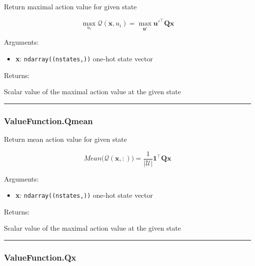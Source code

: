 Return maximal action value for given state

\[
\max_{u_i}\mathcal Q(\mathbf x, u_i) = \max_{\mathbf u'} \mathbf u'^\top \mathbf Q \mathbf x
\]

Arguments:

\begin{itemize}
\tightlist
\item
  \textbf{x}: \texttt{ndarray((nstates,))} one-hot state vector
\end{itemize}

Returns:

Scalar value of the maximal action value at the given state

\begin{center}\rule{0.5\linewidth}{\linethickness}\end{center}

\hypertarget{valuefunction.qmean}{%
\subsubsection{ValueFunction.Qmean}\label{valuefunction.qmean}}

\begin{Shaded}
\begin{Highlighting}[]
\end{Highlighting}
\end{Shaded}

Return mean action value for given state

\[
Mean \big(\mathcal Q(\mathbf x, :)\big) = \frac{1}{|\mathcal U|} \mathbf 1^\top \mathbf Q \mathbf x
\]

Arguments:

\begin{itemize}
\tightlist
\item
  \textbf{x}: \texttt{ndarray((nstates,))} one-hot state vector
\end{itemize}

Returns:

Scalar value of the maximal action value at the given state

\begin{center}\rule{0.5\linewidth}{\linethickness}\end{center}

\hypertarget{valuefunction.qx}{%
\subsubsection{ValueFunction.Qx}\label{valuefunction.qx}}

